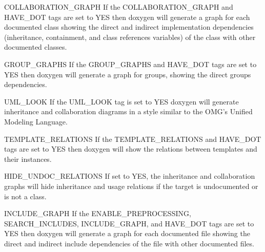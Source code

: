 \begin{DoxyDescription}
\label{config_cfg_collaboration_graph}
\hypertarget{config_cfg_collaboration_graph}{}
 
\item[{\ttfamily COLLABORATION\_\-GRAPH} ] If the {\ttfamily COLLABORATION\_\-GRAPH} and {\ttfamily HAVE\_\-DOT} tags are set to {\ttfamily YES} then doxygen will generate a graph for each documented class showing the direct and indirect implementation dependencies (inheritance, containment, and class references variables) of the class with other documented classes.

\label{config_cfg_group_graphs}
\hypertarget{config_cfg_group_graphs}{}
 
\item[{\ttfamily GROUP\_\-GRAPHS} ] If the GROUP\_\-GRAPHS and HAVE\_\-DOT tags are set to YES then doxygen will generate a graph for groups, showing the direct groups dependencies.

\label{config_cfg_uml_look}
\hypertarget{config_cfg_uml_look}{}
 
\item[{\ttfamily UML\_\-LOOK} ] If the UML\_\-LOOK tag is set to YES doxygen will generate inheritance and collaboration diagrams in a style similar to the OMG's Unified Modeling Language.

\label{config_cfg_template_relations}
\hypertarget{config_cfg_template_relations}{}
 
\item[{\ttfamily TEMPLATE\_\-RELATIONS} ] If the {\ttfamily TEMPLATE\_\-RELATIONS} and {\ttfamily HAVE\_\-DOT} tags are set to {\ttfamily YES} then doxygen will show the relations between templates and their instances.

\label{config_cfg_hide_undoc_relations}
\hypertarget{config_cfg_hide_undoc_relations}{}
 
\item[{\ttfamily HIDE\_\-UNDOC\_\-RELATIONS} ] If set to YES, the inheritance and collaboration graphs will hide inheritance and usage relations if the target is undocumented or is not a class.

\label{config_cfg_include_graph}
\hypertarget{config_cfg_include_graph}{}
 
\item[{\ttfamily INCLUDE\_\-GRAPH} ] If the {\ttfamily ENABLE\_\-PREPROCESSING}, {\ttfamily SEARCH\_\-INCLUDES}, {\ttfamily INCLUDE\_\-GRAPH}, and {\ttfamily HAVE\_\-DOT} tags are set to {\ttfamily YES} then doxygen will generate a graph for each documented file showing the direct and indirect include dependencies of the file with other documented files.


\end{DoxyDescription}
